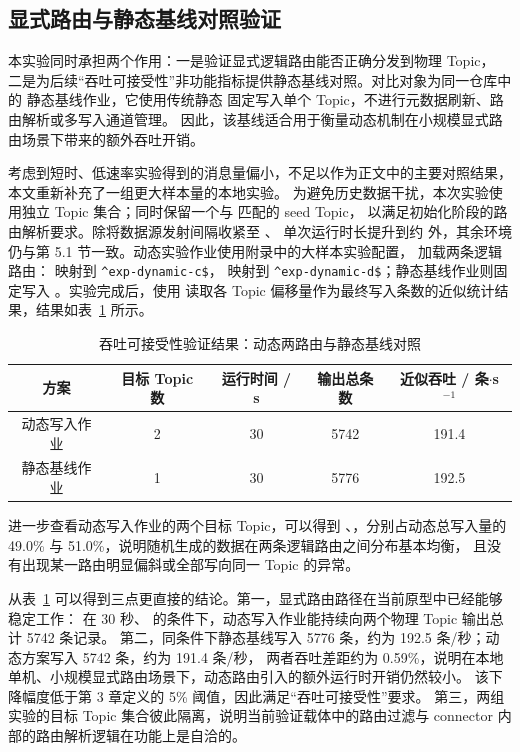 \subsection{显式路由与静态基线对照验证}

本实验同时承担两个作用：一是验证显式逻辑路由能否正确分发到物理 Topic，
二是为后续“吞吐可接受性”非功能指标提供静态基线对照。对比对象为同一仓库中的
静态基线作业，它使用传统静态  固定写入单个 Topic，不进行元数据刷新、路由解析或多写入通道管理。
因此，该基线适合用于衡量动态机制在小规模显式路由场景下带来的额外吞吐开销。

考虑到短时、低速率实验得到的消息量偏小，不足以作为正文中的主要对照结果，本文重新补充了一组更大样本量的本地实验。
为避免历史数据干扰，本次实验使用独立 Topic 集合；同时保留一个与  匹配的 seed Topic，
以满足初始化阶段的路由解析要求。除将数据源发射间隔收紧至 、
单次运行时长提升到约  外，其余环境仍与第 5.1 节一致。动态实验作业使用附录中的大样本实验配置，
加载两条逻辑路由： 映射到 \texttt{\^{}exp-dynamic-c\$}，
 映射到 \texttt{\^{}exp-dynamic-d\$}；静态基线作业则固定写入
。实验完成后，使用  读取各 Topic
偏移量作为最终写入条数的近似统计结果，结果如表~\ref{tab:local-exp-results} 所示。

\begin{table}[htbp]
  \centering
  \caption{吞吐可接受性验证结果：动态两路由与静态基线对照}
  \label{tab:local-exp-results}
  \begin{tabular}{ccccc}
    \toprule
    方案 & 目标 Topic 数 & 运行时间 / s & 输出总条数 & 近似吞吐 / 条$\cdot$s$^{-1}$ \\
    \midrule
    动态写入作业 & 2 & 30 & 5742 & 191.4 \\
    静态基线作业 & 1 & 30 & 5776 & 192.5 \\
    \bottomrule
  \end{tabular}
\end{table}

进一步查看动态写入作业的两个目标 Topic，可以得到
、，分别占动态总写入量的
49.0\% 与 51.0\%，说明随机生成的数据在两条逻辑路由之间分布基本均衡，
且没有出现某一路由明显偏斜或全部写向同一 Topic 的异常。

从表~\ref{tab:local-exp-results} 可以得到三点更直接的结论。第一，显式路由路径在当前原型中已经能够稳定工作：
在 30 秒、 的条件下，动态写入作业能持续向两个物理 Topic 输出总计 5742 条记录。
第二，同条件下静态基线写入 5776 条，约为 192.5 条/秒；动态方案写入 5742 条，约为 191.4 条/秒，
两者吞吐差距约为 0.59\%，说明在本地单机、小规模显式路由场景下，动态路由引入的额外运行时开销仍然较小。
该下降幅度低于第 3 章定义的 5\% 阈值，因此满足“吞吐可接受性”要求。
第三，两组实验的目标 Topic 集合彼此隔离，说明当前验证载体中的路由过滤与 connector 内部的路由解析逻辑在功能上是自洽的。

